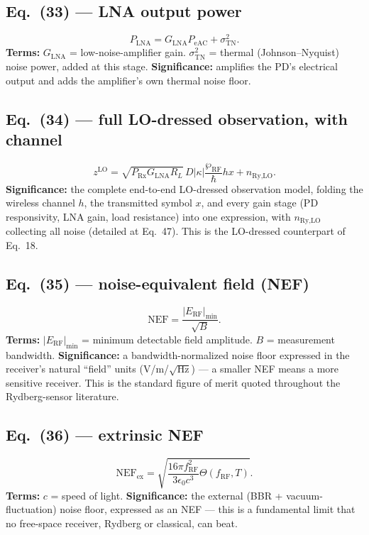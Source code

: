 \documentclass[11pt]{article}
\begin{document}
\subsection*{Eq.~(33) --- LNA output power}
\begin{equation}
P_\text{LNA} = G_\text{LNA}P_\text{eAC}+\sigma_\text{TN}^2. \tag{33}
\end{equation}
\textbf{Terms:} $G_\text{LNA}$ = low-noise-amplifier gain.
$\sigma_\text{TN}^2$ = thermal (Johnson--Nyquist) noise power, added at
this stage.
\textbf{Significance:} amplifies the PD's electrical output and adds
the amplifier's own thermal noise floor.

\subsection*{Eq.~(34) --- full LO-dressed observation, with channel}
\begin{equation}
z^\text{LO} = \sqrt{P_\text{Rx}G_\text{LNA}R_L}\,D|\kappa|\frac{\wp_\text{RF}}{\hbar}hx+n_{\text{Ry,LO}}. \tag{34}
\end{equation}
\textbf{Significance:} the complete end-to-end LO-dressed observation
model, folding the wireless channel $h$, the transmitted symbol $x$, and
every gain stage (PD responsivity, LNA gain, load resistance) into one
expression, with $n_{\text{Ry,LO}}$ collecting all noise (detailed at
Eq.~47). This is the LO-dressed counterpart of Eq.~18.

\subsection*{Eq.~(35) --- noise-equivalent field (NEF)}
\begin{equation}
\text{NEF}=\frac{|E_\text{RF}|_\text{min}}{\sqrt{B}}. \tag{35}
\end{equation}
\textbf{Terms:} $|E_\text{RF}|_\text{min}$ = minimum detectable field
amplitude. $B$ = measurement bandwidth.
\textbf{Significance:} a bandwidth-normalized noise floor expressed in
the receiver's natural ``field'' units (V/m/$\sqrt{\text{Hz}}$) --- a
smaller NEF means a more sensitive receiver. This is the standard
figure of merit quoted throughout the Rydberg-sensor literature.

\subsection*{Eq.~(36) --- extrinsic NEF}
\begin{equation}
\text{NEF}_\text{ex} = \sqrt{\frac{16\pi f_\text{RF}^2}{3\epsilon_0c^3}\Theta(f_\text{RF},T)}. \tag{36}
\end{equation}
\textbf{Terms:} $c$ = speed of light.
\textbf{Significance:} the external (BBR + vacuum-fluctuation) noise
floor, expressed as an NEF --- this is a fundamental limit that no
free-space receiver, Rydberg or classical, can beat.
\end{document}
